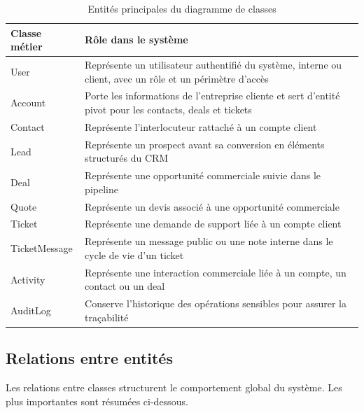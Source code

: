 \begin{table}[H]
\centering
\caption{Entités principales du diagramme de classes}
\label{tab:classes}
\begin{tabularx}{\textwidth}{|l|X|}
\hline
\textbf{Classe métier} & \textbf{Rôle dans le système} \\
\hline
User & Représente un utilisateur authentifié du système, interne ou client, avec un rôle et un périmètre d'accès \\
\hline
Account & Porte les informations de l'entreprise cliente et sert d'entité pivot pour les contacts, deals et tickets \\
\hline
Contact & Représente l'interlocuteur rattaché à un compte client \\
\hline
Lead & Représente un prospect avant sa conversion en éléments structurés du CRM \\
\hline
Deal & Représente une opportunité commerciale suivie dans le pipeline \\
\hline
Quote & Représente un devis associé à une opportunité commerciale \\
\hline
Ticket & Représente une demande de support liée à un compte client \\
\hline
TicketMessage & Représente un message public ou une note interne dans le cycle de vie d'un ticket \\
\hline
Activity & Représente une interaction commerciale liée à un compte, un contact ou un deal \\
\hline
AuditLog & Conserve l'historique des opérations sensibles pour assurer la traçabilité \\
\hline
\end{tabularx}
\end{table}


\subsection{Relations entre entités}
Les relations entre classes structurent le comportement global du système. Les plus importantes sont résumées ci-dessous.

